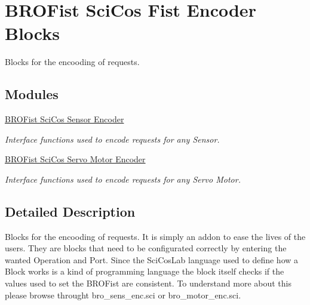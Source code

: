 \hypertarget{group___b_r_o_cos_enc}{
\section{BROFist SciCos Fist Encoder Blocks}
\label{group___b_r_o_cos_enc}
}


Blocks for the encooding of requests.  


\subsection*{Modules}
\begin{DoxyCompactItemize}
\item 
\hyperlink{group___b_r_o_cos_sens_enc}{BROFist SciCos Sensor Encoder}


\begin{DoxyCompactList}\small\item\em Interface functions used to encode requests for any Sensor. \item\end{DoxyCompactList}

\item 
\hyperlink{group___b_r_o_cos_mot_enc}{BROFist SciCos Servo Motor Encoder}


\begin{DoxyCompactList}\small\item\em Interface functions used to encode requests for any Servo Motor. \item\end{DoxyCompactList}

\end{DoxyCompactItemize}


\subsection{Detailed Description}
Blocks for the encooding of requests. It is simply an addon to ease the lives of the users. They are blocks that need to be configurated correctly by entering the wanted Operation and Port. Since the SciCosLab language used to define how a Block works is a kind of programming language the block itself checks if the values used to set the BROFist are consistent. To understand more about this please browse throught {\ttfamily bro\_\-sens\_\-enc.sci} or {\ttfamily bro\_\-motor\_\-enc.sci}. 